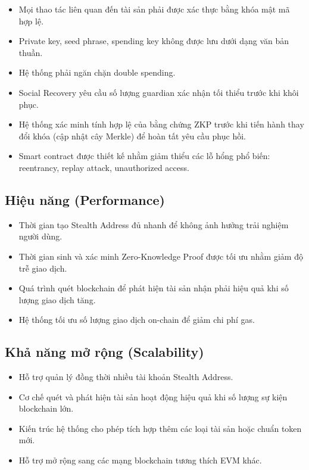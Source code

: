 \documentclass[../DoAn.tex]{subfiles}
\begin{document}
\begin{itemize}
\item Mọi thao tác liên quan đến tài sản phải được xác thực bằng khóa mật mã hợp lệ.
\item Private key, seed phrase, spending key không được lưu dưới dạng văn bản thuần.
\item Hệ thống phải ngăn chặn double spending.
\item Social Recovery yêu cầu số lượng guardian xác nhận tối thiểu trước khi khôi phục.
\item Hệ thống xác minh tính hợp lệ của bằng chứng ZKP trước khi tiến hành thay đổi khóa (cập nhật cây Merkle) để hoàn tất yêu cầu phục hồi.
\item Smart contract được thiết kế nhằm giảm thiểu các lỗ hổng phổ biến: reentrancy, replay attack, unauthorized access.
\end{itemize}

\subsection{Hiệu năng (Performance)}

\begin{itemize}
\item Thời gian tạo Stealth Address đủ nhanh để không ảnh hưởng trải nghiệm người dùng.
\item Thời gian sinh và xác minh Zero-Knowledge Proof được tối ưu nhằm giảm độ trễ giao dịch.
\item Quá trình quét blockchain để phát hiện tài sản nhận phải hiệu quả khi số lượng giao dịch tăng.
\item Hệ thống tối ưu số lượng giao dịch on-chain để giảm chi phí gas.
\end{itemize}

\subsection{Khả năng mở rộng (Scalability)}

\begin{itemize}
\item Hỗ trợ quản lý đồng thời nhiều tài khoản Stealth Address.
\item Cơ chế quét và phát hiện tài sản hoạt động hiệu quả khi số lượng sự kiện blockchain lớn.
\item Kiến trúc hệ thống cho phép tích hợp thêm các loại tài sản hoặc chuẩn token mới.
\item Hỗ trợ mở rộng sang các mạng blockchain tương thích EVM khác.
\end{itemize}
\end{document}
